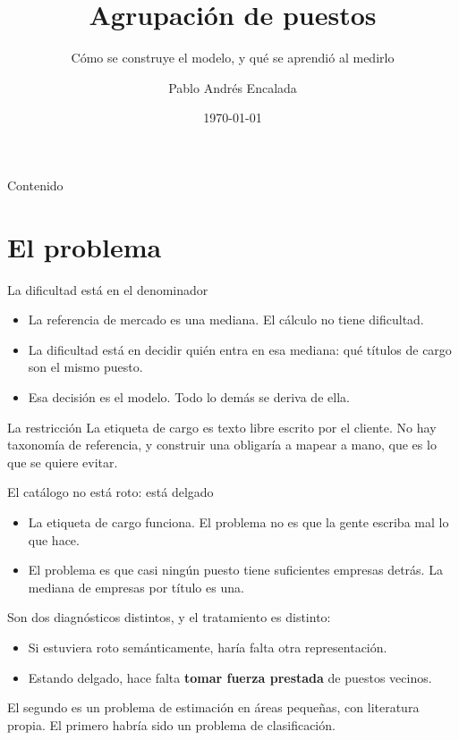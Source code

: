 \documentclass[11pt]{beamer}
\title[Agrupación de puestos]{Agrupación de puestos}
\subtitle{Cómo se construye el modelo, y qué se aprendió al medirlo}
\author[P. A. Encalada]{Pablo Andrés Encalada}
\institute[ActuaLab]{ActuaLab}
\date{\today}
\begin{document}
\begin{frame}[plain]
\titlepage
\end{frame}

\begin{frame}{Contenido}
\tableofcontents
\end{frame}

\section{El problema}

\begin{frame}{La dificultad está en el denominador}
\begin{itemize}
\item La referencia de mercado es una mediana. El cálculo no tiene dificultad.
\item La dificultad está en decidir \alert{quién entra} en esa mediana: qué
títulos de cargo son el mismo puesto.
\item Esa decisión es el modelo. Todo lo demás se deriva de ella.
\end{itemize}
\vspace{1em}
\begin{block}{La restricción}
La etiqueta de cargo es texto libre escrito por el cliente. No hay taxonomía de
referencia, y construir una obligaría a mapear a mano, que es lo que se quiere
evitar.
\end{block}
\end{frame}

\begin{frame}{El catálogo no está roto: está delgado}
\begin{itemize}
\item La etiqueta de cargo funciona. El problema no es que la gente escriba mal
lo que hace.
\item El problema es que \alert{casi ningún puesto tiene suficientes empresas
detrás}. La mediana de empresas por título es \alert{una}.
\end{itemize}
\vspace{0.8em}
Son dos diagnósticos distintos, y el tratamiento es distinto:
\begin{itemize}
\item Si estuviera roto semánticamente, haría falta otra representación.
\item Estando delgado, hace falta \textbf{tomar fuerza prestada} de puestos
vecinos.
\end{itemize}
\vspace{0.8em}
El segundo es un problema de estimación en áreas pequeñas, con literatura
propia. El primero habría sido un problema de clasificación.
\end{frame}
\end{document}
